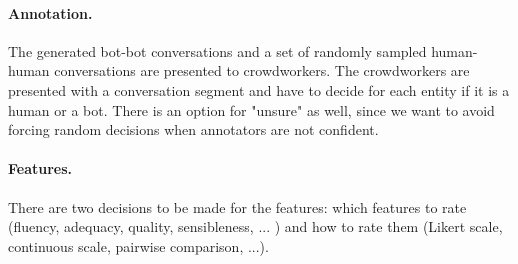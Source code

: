 \paragraph{Annotation.} The generated bot-bot conversations and a set of randomly sampled human-human conversations are presented to crowdworkers. The crowdworkers are presented with a conversation segment and have to decide for each entity if it is a human or a bot. There is an option for "unsure" as well, since we want to avoid forcing random decisions when annotators are not confident.%
\paragraph{Features.} There are two decisions to be made for the features: which features to rate (fluency, adequacy, quality, sensibleness, ... ) and how to rate them (Likert scale, continuous scale, pairwise comparison, ...).
